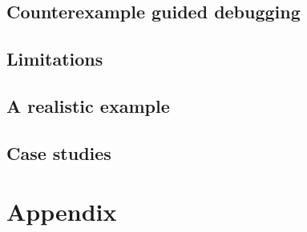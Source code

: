 \documentclass{book}
\theoremstyle{definition}
\begin{document}
\section{Counterexample guided debugging}
\section{Limitations}

\section{A realistic example}

\section{Case studies}

\chapter{Appendix}
\end{document}
